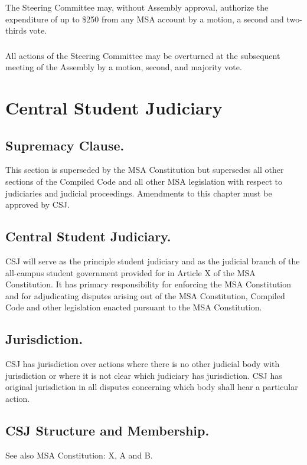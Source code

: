 \subsubsection{}
The Steering Committee may, without Assembly approval, authorize the expenditure of up to \$250 from any MSA account by a motion, a second and two-thirds vote.
\subsubsection{}
All actions of the Steering Committee may be overturned at the subsequent meeting of the Assembly by a motion, second, and majority vote.


\section{Central Student Judiciary}

\subsection{Supremacy Clause.}
This section is superseded by the MSA Constitution but supersedes all other sections of the Compiled Code and all other MSA legislation with respect to judiciaries and judicial proceedings.  Amendments to this chapter must be approved by CSJ.

\subsection{Central Student Judiciary.}
CSJ will serve as the principle  student judiciary and as the judicial branch of the all-campus student government provided for in Article X of the MSA Constitution.  It has primary responsibility for enforcing the MSA Constitution and for adjudicating disputes arising out of the MSA Constitution, Compiled Code and other legislation enacted pursuant to the MSA Constitution.

\subsection{Jurisdiction.}
CSJ has jurisdiction over actions where there is no other judicial body with jurisdiction or where it is not clear which judiciary has jurisdiction.  CSJ has original jurisdiction in all disputes concerning which body shall hear a particular action.

\subsection{CSJ Structure and Membership.}
See also MSA Constitution: X, A and B.
